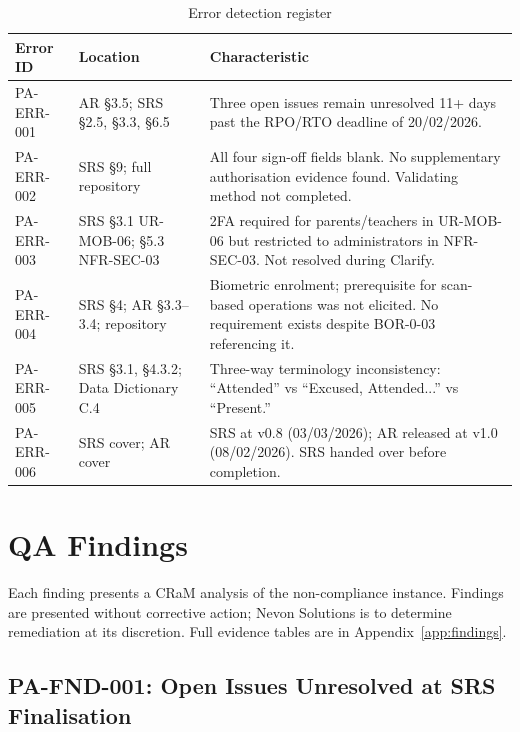 \documentclass[11pt,a4paper]{article}
\begin{document}
\begin{table}[H]
\centering\small
\begin{tabular}{|L{1.8cm}|L{3cm}|>{\RaggedRight\arraybackslash}m{7.5cm}|}
\hline
{}
\textbf{Error ID} & \textbf{Location} & \textbf{Characteristic} \\\hline
PA-ERR-001 & AR \S3.5; SRS \S2.5, \S3.3, \S6.5 & Three open issues remain unresolved 11+ days past the RPO/RTO deadline of 20/02/2026. \\\hline
PA-ERR-002 & SRS \S9; full repository & All four sign-off fields blank. No supplementary authorisation evidence found. Validating method not completed. \\\hline
PA-ERR-003 & SRS \S3.1 UR-MOB-06; \S5.3 NFR-SEC-03 & 2FA required for parents/teachers in UR-MOB-06 but restricted to administrators in NFR-SEC-03. Not resolved during Clarify. \\\hline
PA-ERR-004 & SRS \S4; AR \S3.3--3.4; repository & Biometric enrolment; prerequisite for scan-based operations was not elicited. No requirement exists despite BOR-0-03 referencing it. \\\hline
PA-ERR-005 & SRS \S3.1, \S4.3.2; Data Dictionary C.4 & Three-way terminology inconsistency: ``Attended'' vs ``Excused, Attended...'' vs ``Present.'' \\\hline
PA-ERR-006 & SRS cover; AR cover & SRS at v0.8 (03/03/2026); AR released at v1.0 (08/02/2026). SRS handed over before completion. \\\hline
\end{tabular}
\caption{Error detection register}
\end{table}

\section{QA Findings}
\label{sec:findings}

Each finding presents a CRaM analysis of the non-compliance instance. Findings are presented without corrective action; Nevon Solutions is to determine remediation at its discretion. Full evidence tables are in Appendix~\ref{app:findings}.

\subsection{PA-FND-001: Open Issues Unresolved at SRS Finalisation}
\end{document}
